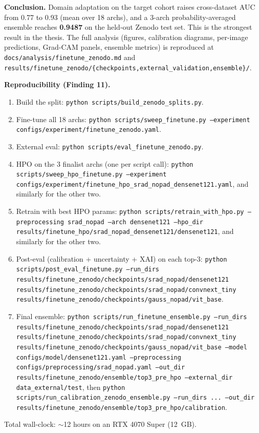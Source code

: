 \documentclass[11pt]{article}
\begin{document}
\textbf{Conclusion.} Domain adaptation on the target cohort raises
cross-dataset AUC from 0.77 to 0.93 (mean over 18 archs), and a 3-arch
probability-averaged ensemble reaches \textbf{0.9487} on the held-out
Zenodo test set. This is the strongest result in the thesis. The full
analysis (figures, calibration diagrams, per-image predictions,
Grad-CAM panels, ensemble metrics) is reproduced at
\texttt{docs/analysis/finetune\_zenodo.md} and
\texttt{results/finetune\_zenodo/\{checkpoints,external\_validation,ensemble\}/}.

\textbf{Reproducibility (Finding 11).}
\begin{enumerate}
  \item Build the split: \texttt{python scripts/build\_zenodo\_splits.py}.
  \item Fine-tune all 18 archs:
        \texttt{python scripts/sweep\_finetune.py --experiment
        configs/experiment/finetune\_zenodo.yaml}.
  \item External eval:
        \texttt{python scripts/eval\_finetune\_zenodo.py}.
  \item HPO on the 3 finalist archs (one per script call):
        \texttt{python scripts/sweep\_hpo\_finetune.py --experiment
        configs/experiment/finetune\_hpo\_srad\_nopad\_densenet121.yaml},
        and similarly for the other two.
  \item Retrain with best HPO params:
        \texttt{python scripts/retrain\_with\_hpo.py --preprocessing
        srad\_nopad --arch densenet121 --hpo\_dir
        results/finetune\_hpo/srad\_nopad\_densenet121/densenet121},
        and similarly for the other two.
  \item Post-eval (calibration + uncertainty + XAI) on each top-3:
        \texttt{python scripts/post\_eval\_finetune.py --run\_dirs
        results/finetune\_zenodo/checkpoints/srad\_nopad/densenet121
        results/finetune\_zenodo/checkpoints/srad\_nopad/convnext\_tiny
        results/finetune\_zenodo/checkpoints/gauss\_nopad/vit\_base}.
  \item Final ensemble:
        \texttt{python scripts/run\_finetune\_ensemble.py --run\_dirs
        results/finetune\_zenodo/checkpoints/srad\_nopad/densenet121
        results/finetune\_zenodo/checkpoints/srad\_nopad/convnext\_tiny
        results/finetune\_zenodo/checkpoints/gauss\_nopad/vit\_base
        --model configs/model/densenet121.yaml --preprocessing
        configs/preprocessing/srad\_nopad.yaml --out\_dir
        results/finetune\_zenodo/ensemble/top3\_pre\_hpo --external\_dir
        data\_external/test}, then
        \texttt{python scripts/run\_calibration\_zenodo\_ensemble.py
        --run\_dirs ... --out\_dir
        results/finetune\_zenodo/ensemble/top3\_pre\_hpo/calibration}.
\end{enumerate}
Total wall-clock: $\sim$12 hours on an RTX 4070 Super (12~GB).
\end{document}
